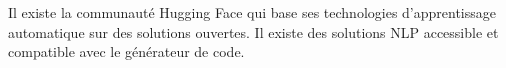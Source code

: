 Il existe la communauté Hugging Face qui base ses technologies d'apprentissage automatique sur des solutions ouvertes. Il existe des solutions NLP accessible et compatible avec le générateur de code.












